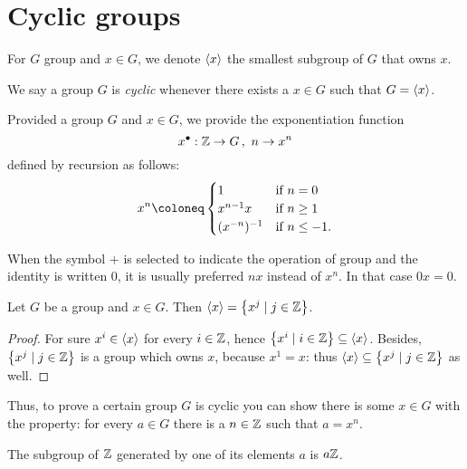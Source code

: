 
\section{Cyclic groups}

For \(G\) group and \(x \in G\), we denote \(\left\langle x\right\rangle\) the smallest subgroup of \(G\) that owns \(x\).

\begin{definition}
We say a group \(G\) is {\em cyclic} whenever there exists a \(x \in G\) such that \(G = \left\langle x\right\rangle\).
\end{definition}

\begin{definition}
Provided a group \(G\) and \(x \in G\), we provide the exponentiation function
\[x^\bullet : \mathbb Z \to G \,, \ n \to x^n\]
defined by recursion as follows:
\[x^n \coloneq \begin{cases}
1        & \text{if } n = 0 \\
x^{n-1}x & \text{if } n \ge 1 \\
\inv{(x^{-n})}   & \text{if } n \le -1.
\end{cases}\]
\end{definition}

When the symbol \(+\) is selected to indicate the operation of group and the identity is written \(0\), it is usually preferred \(nx\) instead of \(x^n\). In that case \(0x = 0\).

\begin{proposition}
Let \(G\) be a group and \(x \in G\). Then \(\left\langle x\right\rangle = \left\{x^j \mid j \in \mathbb Z\right\}\).
\end{proposition}

\begin{proof}
For sure \(x^i \in \left\langle x\right\rangle\) for every \(i \in \mathbb Z\), hence \(\left\{x^i \mid i \in \mathbb Z\right\} \subseteq \left\langle x\right\rangle\). Besides, \(\left\{x^j \mid j \in \mathbb Z\right\}\) is a group which owns \(x\), because \(x^1 = x\): thus \(\left\langle x\right\rangle \subseteq \left\{x^j \mid j \in \mathbb Z\right\}\) as well.
\end{proof}

Thus, to prove a certain group \(G\) is cyclic you can show there is some \(x \in G\) with the property: for every \(a \in G\) there is a \(n \in \mathbb Z\) such that \(a = x^n\).

\begin{example}
The subgroup of \(\mathbb Z\) generated by one of its elements \(a\) is \(a \mathbb Z\).
\end{example}

